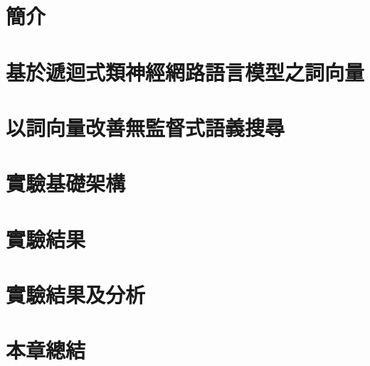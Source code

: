 \section{簡介}

\section{基於遞迴式類神經網路語言模型之詞向量}

\section{以詞向量改善無監督式語義搜尋}

\section{實驗基礎架構}

\section{實驗結果}

\section{實驗結果及分析}

\section{本章總結}
